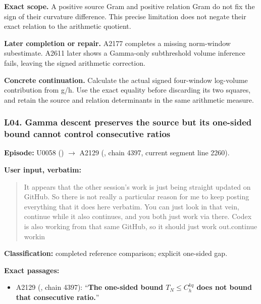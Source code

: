 \textbf{Exact scope.} A positive source Gram and positive relation Gram
do not fix the sign of their curvature difference. This precise
limitation does not negate their exact relation to the arithmetic
quotient.

\textbf{Later completion or repair.} A2177 completes a missing
norm-window subestimate. A2611 later shows a Gamma-only subthreshold
volume inference fails, leaving the signed arithmetic correction.

\textbf{Concrete continuation.} Calculate the actual signed four-window
log-volume contribution from g/h. Use the exact equality before
discarding its two squares, and retain the source and relation
determinants in the same arithmetic measure.

\subsubsection{L04. Gamma descent preserves the source but its one-sided
bound cannot control consecutive
ratios}\label{l04.-gamma-descent-preserves-the-source-but-its-one-sided-bound-cannot-control-consecutive-ratios}

\textbf{Episode:} U0058
(\protect{})
\allowbreak{}\ensuremath{→}\allowbreak{} A2129
(\protect{}, chain 4397,
current segment line 2260).

\textbf{User input, verbatim:}

\begin{quote}
It appears that the other session's work is just being straight updated
on GitHub. So there is not really a particular reason for me to keep
posting everything that it does here verbatim. You can just look in that
vein, continue while it also continues, and you both just work via
there. Codex is also working from that same GitHub, so it should just
work out.continue workin
\end{quote}

\textbf{Classification:} completed reference comparison; explicit
one-sided gap.

\textbf{Exact passages:}

\begin{itemize}
\tightlist
\item
  A2129 (\protect{}, chain
  4397): ``\textbf{The one-sided bound \(T_N\le C_h^{kq}\) does not
  bound that consecutive ratio.}''
\end{itemize}

